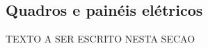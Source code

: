 \subsection{Quadros e painéis elétricos} \label{section: switchboard}
TEXTO A SER ESCRITO NESTA SECAO













\newpage
